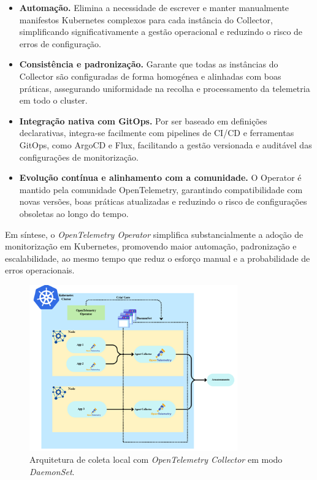 \begin{itemize}
    \item \textbf{Automação.} Elimina a necessidade de escrever e manter manualmente manifestos Kubernetes complexos para cada instância do Collector, simplificando significativamente a gestão operacional e reduzindo o risco de erros de configuração.

    \item \textbf{Consistência e padronização.} Garante que todas as instâncias do Collector são configuradas de forma homogénea e alinhadas com boas práticas, assegurando uniformidade na recolha e processamento da telemetria em todo o cluster.

    \item \textbf{Integração nativa com GitOps.} Por ser baseado em definições declarativas, integra-se facilmente com pipelines de CI/CD e ferramentas GitOps, como ArgoCD e Flux, facilitando a gestão versionada e auditável das configurações de monitorização.

    \item \textbf{Evolução contínua e alinhamento com a comunidade.} O Operator é mantido pela comunidade OpenTelemetry, garantindo compatibilidade com novas versões, boas práticas atualizadas e reduzindo o risco de configurações obsoletas ao longo do tempo.
\end{itemize}


Em síntese, o \textit{OpenTelemetry Operator} simplifica substancialmente a adoção de monitorização em Kubernetes, promovendo maior automação, padronização e escalabilidade, ao mesmo tempo que reduz o esforço manual e a probabilidade de erros operacionais.

\begin{figure}[H]
    \centering
    \includegraphics[width=0.8\textwidth]{images/Diagramas/daemonset_collector.png}
    \caption{Arquitetura de coleta local com \textit{OpenTelemetry Collector} em modo \textit{DaemonSet}.}
    \label{fig:otel-daemonset}
\end{figure}


